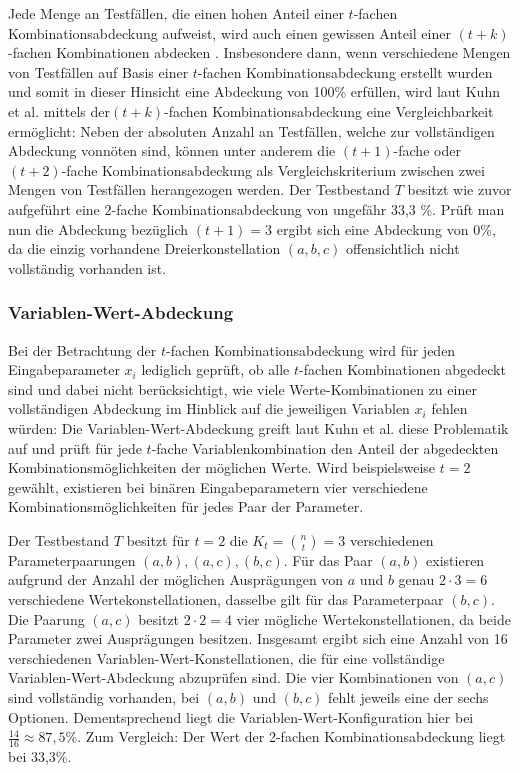 Jede Menge an Testfällen, die einen hohen Anteil einer $t$-fachen Kombinationsabdeckung aufweist, wird auch einen gewissen Anteil einer $(t+k)$-fachen Kombinationen abdecken \cite{kuhn2010practical}. Insbesondere dann, wenn verschiedene Mengen von Testfällen auf Basis einer $t$-fachen Kombinationsabdeckung erstellt wurden und somit in dieser Hinsicht eine Abdeckung von 100\% erfüllen, wird laut Kuhn et al. \cite{kuhn2010practical} mittels der$(t+k)$-fachen Kombinationsabdeckung eine Vergleichbarkeit ermöglicht: Neben der absoluten Anzahl an Testfällen, welche zur vollständigen Abdeckung vonnöten sind, können unter anderem die $(t+1)$-fache oder $(t+2)$-fache Kombinationsabdeckung als Vergleichskriterium zwischen zwei Mengen von Testfällen herangezogen werden. Der Testbestand $T$ besitzt wie zuvor aufgeführt eine $2$-fache Kombinationsabdeckung von ungefähr 33,3 \%. Prüft man nun die Abdeckung bezüglich $(t+1) = 3$ ergibt sich eine Abdeckung von 0\%, da die einzig vorhandene Dreierkonstellation $(a,b,c)$ offensichtlich nicht vollständig vorhanden ist.  

\subsubsection{Variablen-Wert-Abdeckung}\label{subsub:variablenWert}

Bei der Betrachtung der $t$-fachen Kombinationsabdeckung wird für jeden Eingabeparameter $x_i$ lediglich geprüft, ob alle $t$-fachen Kombinationen abgedeckt sind und dabei nicht berücksichtigt, wie viele Werte-Kombinationen zu einer vollständigen Abdeckung im Hinblick auf die jeweiligen Variablen $x_i$ fehlen würden: Die Variablen-Wert-Abdeckung greift laut Kuhn et al. \cite{kuhn2010practical} diese Problematik auf und prüft für jede $t$-fache Variablenkombination den Anteil der abgedeckten Kombinationsmöglichkeiten der möglichen Werte. Wird beispielsweise $t=2$ gewählt, existieren bei binären Eingabeparametern vier verschiedene Kombinationsmöglichkeiten für jedes Paar der Parameter.
  

Der Testbestand $T$ besitzt für $t=2$ die $K_t = \binom{n}{t} = 3$ verschiedenen Parameterpaarungen $(a,b), (a,c), (b,c)$. Für das Paar $(a,b)$ existieren aufgrund der Anzahl der möglichen Ausprägungen von $a$ und $b$ genau $2 \cdot 3 = 6$ verschiedene Wertekonstellationen, dasselbe gilt für das Parameterpaar $(b,c)$. Die Paarung $(a,c)$ besitzt $2 \cdot 2 = 4$ vier mögliche Wertekonstellationen, da beide Parameter zwei Ausprägungen besitzen. Insgesamt ergibt sich eine Anzahl von 16 verschiedenen Variablen-Wert-Konstellationen, die für eine vollständige Variablen-Wert-Abdeckung abzuprüfen sind. Die vier Kombinationen von $(a,c)$ sind vollständig vorhanden, bei $(a,b)$ und $(b,c)$ fehlt jeweils eine der sechs Optionen. Dementsprechend liegt die Variablen-Wert-Konfiguration hier bei $\frac{14}{16} \approx 87,5 \%$. Zum Vergleich: Der Wert der 2-fachen Kombinationsabdeckung liegt bei 33,3\%.

